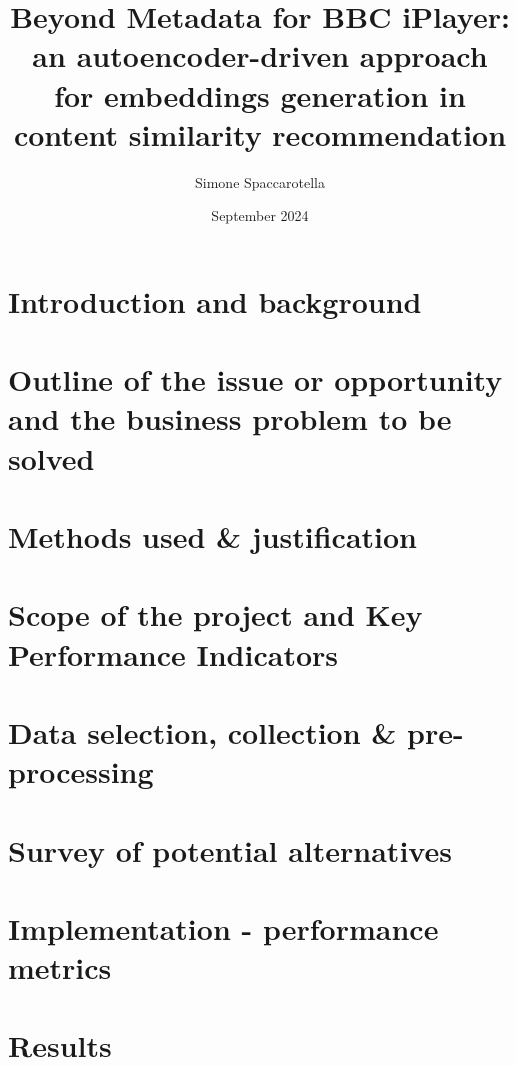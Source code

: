 \documentclass[12pt,a4paper]{article}
\begin{document}
\title{Beyond Metadata for BBC iPlayer:\\an autoencoder-driven approach for embeddings generation in content similarity recommendation}
\author{Simone Spaccarotella}
\date{September 2024}

\maketitle
\tableofcontents

\section{Introduction and background}

\section{Outline of the issue or opportunity and the business problem to be solved}

\section{Methods used \& justification}

\section{Scope of the project and Key Performance Indicators}

\section{Data selection, collection \& pre-processing}

\section{Survey of potential alternatives}

\section{Implementation - performance metrics}

\section{Results}
\end{document}
